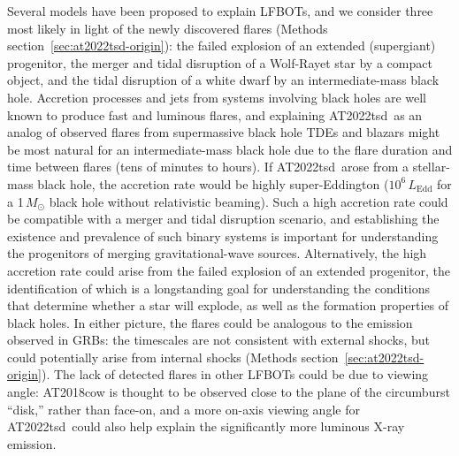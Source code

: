 \documentclass{nature_plusfigure}
\newcommand{\at}{AT2022tsd}
\begin{document}
Several models have been proposed to explain LFBOTs\cite{Metzger2022}, and we consider three most likely in light of the newly discovered flares (Methods section~\ref{sec:at2022tsd-origin}): the failed explosion of an extended (supergiant) progenitor\cite{Kashiyama2015,Perley2019,Margutti2019,Quataert2019}, the merger and tidal disruption of a Wolf-Rayet star by a compact object\cite{Metzger2022}, and the tidal disruption of a white dwarf by an intermediate-mass black hole\cite{Kuin2019,Perley2019}.
Accretion processes and jets from systems involving black holes are well known to produce fast and luminous flares,
and explaining \at\ as an analog of observed flares from supermassive black hole TDEs and blazars might be most natural for an intermediate-mass black hole due to the flare duration and time between flares (tens of minutes to hours).
If \at\ arose from a stellar-mass black hole, the accretion rate would be highly super-Eddington ($10^{6}\,L_\mathrm{Edd}$ for a 1\,$M_\odot$ black hole without relativistic beaming). Such a high accretion rate could be compatible with a merger and tidal disruption scenario\cite{Metzger2022}, and establishing the existence and prevalence of such binary systems is important for understanding the progenitors of merging gravitational-wave sources.
Alternatively, the high accretion rate could arise from the failed explosion of an extended progenitor\cite{Woosley1993,Quataert2012,Kashiyama2015,Quataert2019}, the identification of which is a longstanding goal for understanding the conditions that determine whether a star will explode, as well as the formation properties of black holes.
In either picture, the flares could be analogous to the emission observed in GRBs: the timescales are not consistent with external shocks, but could potentially arise from internal shocks (Methods section~\ref{sec:at2022tsd-origin}).
The lack of detected flares in other LFBOTs could be due to viewing angle: AT2018cow is thought to be observed close to the plane of the circumburst ``disk,'' rather than face-on\cite{Margutti2019,Chen2023}, and a more on-axis viewing angle for \at\ could also help explain the significantly more luminous X-ray emission.
\end{document}
